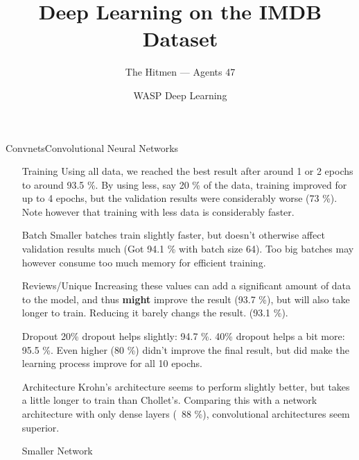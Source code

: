 \documentclass{beamer}
\title{Deep Learning on the IMDB Dataset}
\date{WASP Deep Learning}
\author[Agents 47]{The Hitmen --- Agents 47}
\begin{document}
\begin{frame}
  \titlepage
\end{frame}


\begin{frame}{Convnets}{Convolutional Neural Networks}

\begin{itemize}

\item[Training] Using all data, we reached the best result after around 1 or 2
  epochs to around 93.5 \%. By using less, say 20 \% of the data, training
  improved for up to 4 epochs, but the validation results were considerably
  worse (73 \%). Note however that training with less data is considerably
  faster.
  
\item[Batch] Smaller batches train slightly faster, but doesn't otherwise
  affect validation results much (Got 94.1 \% with batch size 64). Too big
  batches may however consume too much memory for efficient training.

\item[Reviews/Unique] Increasing these values can add a significant amount of
  data to the model, and thus \textbf{might} improve the result (93.7 \%), but
  will also take longer to train. Reducing it barely changs the result. (93.1
  \%).
 
\item[Dropout] 20\% dropout helps slightly: 94.7 \%.  40\% dropout helps a bit
  more: 95.5 \%. Even higher (80 \%) didn't improve the final result, but did
  make the learning process improve for all 10 epochs.

\item[Architecture] Krohn's architecture seems to perform slightly better, but
  takes a little longer to train than Chollet's. Comparing this with a network
  architecture with only dense layers (~88 \%), convolutional architectures seem
  superior.

\item[Smaller Network]
  
\end{itemize}

\end{frame}
\end{document}
